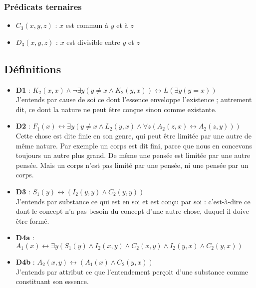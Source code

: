 \documentclass[10pt,a3paper]{article}
\begin{document}
\subsubsection{Prédicats ternaires}
\begin{itemize}
    \item $C_3(x,y,z)$ : $x$ est commun à $y$ et à $z$
    \item $D_3(x,y,z)$ : $x$ est divisible entre $y$ et $z$
\end{itemize}

\subsection{Définitions}
\begin{itemize}
    \item \textbf{D1} : $K_2(x,x) \land \neg \exists y (y \neq x \land K_2(y,x)) \leftrightarrow L(\exists y (y = x))$ \\
    J’entends par cause de soi ce dont l’essence enveloppe l’existence ; autrement dit, ce dont la nature ne peut être conçue sinon comme existante.
    
    \item \textbf{D2} : $F_1(x) \leftrightarrow \exists y (y \neq x \land L_2(y,x) \land \forall z (A_2(z,x) \leftrightarrow A_2(z,y)))$ \\
    Cette chose est dite finie en son genre, qui peut être limitée par une autre de même nature. Par exemple un corps est dit fini, parce que nous en concevons toujours un autre plus grand. De même une pensée est limitée par une autre pensée. Mais un corps n’est pas limité par une pensée, ni une pensée par un corps.
    
    \item \textbf{D3} : $S_1(y) \leftrightarrow (I_2(y,y) \land C_2(y,y))$ \\
    J’entends par substance ce qui est en soi et est conçu par soi : c’est-à-dire ce dont le concept n’a pas besoin du concept d’une autre chose, duquel il doive être formé.
    
    \item \textbf{D4a} : $A_1(x) \leftrightarrow \exists y (S_1(y) \land I_2(x,y) \land C_2(x,y) \land I_2(y,x) \land C_2(y,x))$ \\    
    \item \textbf{D4b} : $A_2(x,y) \leftrightarrow (A_1(x) \land C_2(y,x))$ \\
    J’entends par attribut ce que l’entendement perçoit d’une substance comme constituant son essence.
    

\end{itemize}
\end{document}
